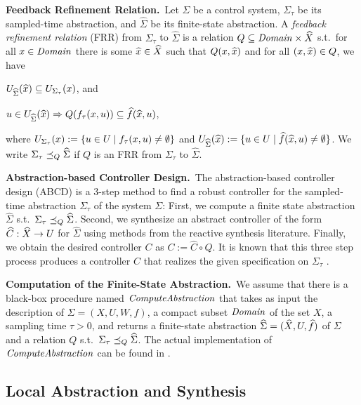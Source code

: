 \smallskip
\noindent\textbf{Feedback Refinement Relation.}\
Let $\Sigma$ be a control system, $\Sigma_\tau$ be its sampled-time abstraction, and $\widehat{\Sigma}$ be its finite-state abstraction.
A \emph{feedback refinement relation} (FRR) from $\Sigma_\tau$ to $\widehat{\Sigma}$ 
is a relation $Q\subseteq \mathit{Domain}\times \widehat{X}$ s.t.\ 
for all $x\in \mathit{Domain}$ there is some $\widehat{x}\in \widehat{X}$ such that $Q(x,\widehat{x})$ and
for all $(x,\widehat{x})\in Q$, we have
\begin{inparaenum}[(i)]
 \item $U_{\widehat{\Sigma}}(\widehat{x})\subseteq U_{\Sigma_\tau}(x)$, and 
 \item $u\in U_{\widehat{\Sigma}}(\widehat{x}) \Rightarrow Q(f_\tau(x,u))\subseteq \widehat{f}(\widehat{x},u)$,
\end{inparaenum}
where $U_{\Sigma_\tau}(x):=\{ u\in U \mid f_\tau(x,u)\neq \emptyset \}$ and $U_{\widehat{\Sigma}}(\widehat{x}):=\{ u\in U \mid \widehat{f}(\widehat{x},u)\neq \emptyset \}$.
We write $\Sigma_\tau \preceq_{Q} \widehat{\Sigma}$ if $Q$ is an FRR from $\Sigma_\tau$ to $\widehat{\Sigma}$.

\smallskip
\noindent\textbf{Abstraction-based Controller Design.}\
The abstraction-based controller design (ABCD) \cite{FRR} is a $3$-step method to find a robust controller for the sampled-time abstraction $\Sigma_\tau$ of the system $\Sigma$:
First, we compute a finite state abstraction $\widehat{\Sigma}$ s.t.\ $\Sigma_\tau \preceq_{Q} \widehat{\Sigma}$.
Second, we synthesize an abstract controller of the form $\widehat{C}:\widehat{X}\rightarrow U$ for $\widehat{\Sigma}$ using methods from the reactive synthesis literature.
Finally, we obtain the desired controller $C$ as $C:=\widehat{C}\circ Q$.
It is known that this three step process produces a controller $C$ that realizes the given specification on $\Sigma_\tau$ \cite{FRR}.

\smallskip
\noindent\textbf{Computation of the Finite-State Abstraction.}\
We assume that there is a black-box procedure named $\mathit{ComputeAbstraction}$ that takes as input the description of $\Sigma = (X,U,W,f)$, a compact subset $\mathit{Domain}$ of the set $X$, a sampling time $\tau>0$, and returns a finite-state abstraction $\widehat{\Sigma} = (\widehat{X},U,\widehat{f})$ of $\Sigma$ and a relation $Q$ s.t.\ $\Sigma_\tau \preceq_{Q} \widehat{\Sigma}$.
The actual implementation of $\mathit{ComputeAbstraction}$ can be found in \cite{FRR}.

\subsection{Local Abstraction and Synthesis}

